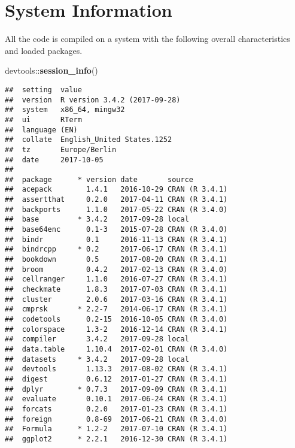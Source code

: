 \documentclass[]{book}
\newenvironment{Shaded}{\begin{snugshade}}{\end{snugshade}}
\newcommand{\KeywordTok}[1]{\textcolor[rgb]{0.13,0.29,0.53}{\textbf{{#1}}}}
\newcommand{\NormalTok}[1]{{#1}}
\theoremstyle{definition}
\theoremstyle{definition}
\theoremstyle{definition}
\theoremstyle{remark}
\begin{document}
\section*{System Information}\label{system-information}

All the code is compiled on a system with the following overall
characteristics and loaded packages.

\begin{Shaded}
\begin{Highlighting}[]
\NormalTok{devtools::}\KeywordTok{session_info}\NormalTok{()}
\end{Highlighting}
\end{Shaded}

\begin{verbatim}
##  setting  value                       
##  version  R version 3.4.2 (2017-09-28)
##  system   x86_64, mingw32             
##  ui       RTerm                       
##  language (EN)                        
##  collate  English_United States.1252  
##  tz       Europe/Berlin               
##  date     2017-10-05                  
## 
##  package      * version date       source        
##  acepack        1.4.1   2016-10-29 CRAN (R 3.4.1)
##  assertthat     0.2.0   2017-04-11 CRAN (R 3.4.1)
##  backports      1.1.0   2017-05-22 CRAN (R 3.4.0)
##  base         * 3.4.2   2017-09-28 local         
##  base64enc      0.1-3   2015-07-28 CRAN (R 3.4.0)
##  bindr          0.1     2016-11-13 CRAN (R 3.4.1)
##  bindrcpp     * 0.2     2017-06-17 CRAN (R 3.4.1)
##  bookdown       0.5     2017-08-20 CRAN (R 3.4.1)
##  broom          0.4.2   2017-02-13 CRAN (R 3.4.0)
##  cellranger     1.1.0   2016-07-27 CRAN (R 3.4.1)
##  checkmate      1.8.3   2017-07-03 CRAN (R 3.4.1)
##  cluster        2.0.6   2017-03-16 CRAN (R 3.4.1)
##  cmprsk       * 2.2-7   2014-06-17 CRAN (R 3.4.1)
##  codetools      0.2-15  2016-10-05 CRAN (R 3.4.0)
##  colorspace     1.3-2   2016-12-14 CRAN (R 3.4.1)
##  compiler       3.4.2   2017-09-28 local         
##  data.table     1.10.4  2017-02-01 CRAN (R 3.4.0)
##  datasets     * 3.4.2   2017-09-28 local         
##  devtools       1.13.3  2017-08-02 CRAN (R 3.4.1)
##  digest         0.6.12  2017-01-27 CRAN (R 3.4.1)
##  dplyr        * 0.7.3   2017-09-09 CRAN (R 3.4.1)
##  evaluate       0.10.1  2017-06-24 CRAN (R 3.4.1)
##  forcats        0.2.0   2017-01-23 CRAN (R 3.4.1)
##  foreign        0.8-69  2017-06-21 CRAN (R 3.4.0)
##  Formula      * 1.2-2   2017-07-10 CRAN (R 3.4.1)
##  ggplot2      * 2.2.1   2016-12-30 CRAN (R 3.4.1)

\end{verbatim}
\end{document}
